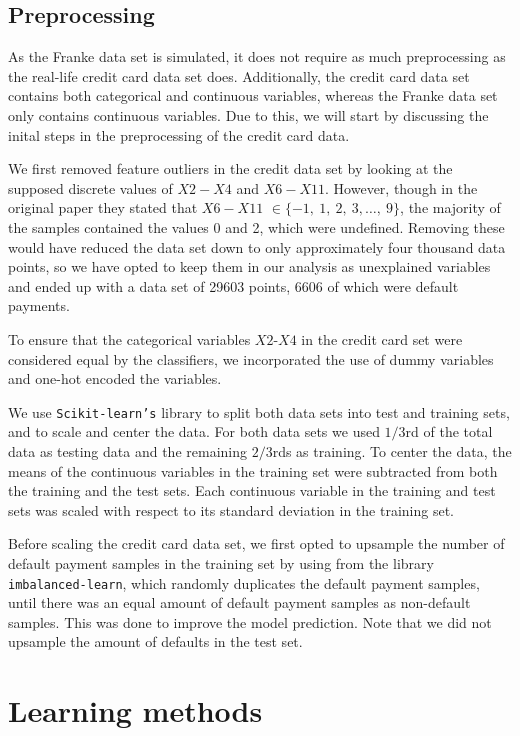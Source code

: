\documentclass[a4paper, 11pt, twocolumn]{article}
\begin{document}
\subsection{Preprocessing}
As the Franke data set is simulated, it does not require as much preprocessing as
the real-life credit card data set does. Additionally, the credit card data set
contains both categorical and continuous variables, whereas the Franke data set
only contains continuous variables. Due to this, we will start by discussing the
inital steps in the preprocessing of the credit card data.

We first removed feature outliers in the credit data set by looking at the supposed
discrete values of $X2-X4$ and $X6-X11$. However, though in the original paper
they stated that $X6-X11$ $\in\{-1,\ 1,\ 2,\ 3,\dots,\ 9\}$, the majority of
the samples contained the values 0 and 2, which were undefined. Removing these
would have reduced the data set down to only approximately four thousand data
points, so we have opted to keep them in our analysis as unexplained variables
and ended up with a data set of 29603 points, 6606 of which were default payments.

To ensure that the categorical variables $X2$-$X4$ in the credit card set were
considered equal by the classifiers, we incorporated the use of dummy variables
and one-hot encoded the variables.

We use \texttt{Scikit-learn's}\cite{sklearn_api} library to split both data sets
into test and training sets, and to scale and center the data.
For both data sets we used $1/3$rd of the total data as testing data
and the remaining $2/3$rds as training. To center the data, the means of the
continuous variables in the training set were subtracted from both the training
and the test sets. Each continuous variable in the training and test sets was
scaled with respect to its standard deviation in the training set.

Before scaling the credit card data set, we first opted to upsample the number of
default payment samples in the training set by using 
from the library \texttt{imbalanced-learn}, which randomly duplicates the default
payment samples, until there was an equal amount of default payment samples as
non-default samples. This was done to improve the model prediction. Note that we
did not upsample the amount of defaults in the test set.


\section{Learning methods}
\end{document}

